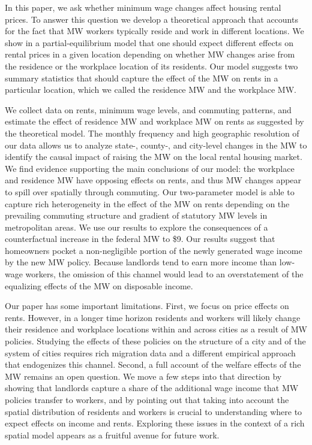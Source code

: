 
In this paper, we ask whether minimum wage changes affect housing rental prices.
To answer this question we develop a theoretical approach that accounts for
the fact that MW workers typically reside and work in different locations.
We show in a partial-equilibrium model that one should expect different effects
on rental prices in a given location depending on whether MW changes arise from 
the residence or the workplace location of its residents.
Our model suggests two summary statistics that should capture the effect of 
the MW on rents in a particular location, which we called the residence MW and 
the workplace MW.

We collect data on rents, minimum wage levels, and commuting patterns, and
estimate the effect of residence MW and workplace MW on rents as suggested by
the theoretical model.
The monthly frequency and high geographic resolution of our data allows us to 
analyze state-, county-, and city-level changes in the MW to identify the causal 
impact of raising the MW on the local rental housing market.
We find evidence supporting the main conclusions of our model: the workplace and 
residence MW have opposing effects on rents, and thus MW changes appear to 
spill over spatially through commuting.
Our two-parameter model is able to capture rich heterogeneity in the effect 
of the MW on rents depending on the prevailing commuting structure and 
gradient of statutory MW levels in metropolitan areas.
We use our results to explore the consequences of a counterfactual increase 
in the federal MW to \$9.
Our results suggest that homeowners pocket a non-negligible portion of the newly 
generated wage income by the new MW policy.
Because landlords tend to earn more income than low-wage workers,
the omission of this channel would lead to an overstatement of the equalizing 
effects of the MW on disposable income.

Our paper has some important limitations.
First, we focus on price effects on rents.
However, in a longer time horizon residents and workers will likely change 
their residence and workplace locations within and across cities as a result 
of MW policies.
Studying the effects of these policies on the structure of a city and of the 
system of cities requires rich migration data and a different empirical approach
that endogenizes this channel.
Second, a full account of the welfare effects of the MW remains an open question.
We move a few steps into that direction by showing that landlords capture a 
share of the additional wage income that MW policies transfer to workers, and 
by pointing out that taking into account the spatial distribution of residents 
and workers is crucial to understanding where to expect effects on income and 
rents.
Exploring these issues in the context of a rich spatial model 
appears as a fruitful avenue for future work.
